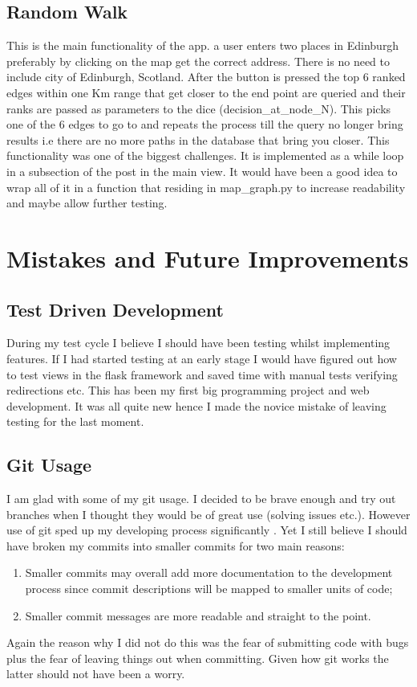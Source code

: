 \documentclass[11pt]{article}
\begin{document}
\subsection{Random Walk}
This is the main functionality of the app. a user enters two places in Edinburgh preferably by clicking on the map get the correct address. There is no need to include city of Edinburgh, Scotland.
\newline
\newline
After the button is pressed the top 6 ranked edges within one Km range that get closer to the end point are queried and their ranks are passed
as parameters to the dice (decision\_at\_node\_N). This picks one of the 6 edges to go to and repeats the process till the query no longer bring results i.e there are no more paths in the database that bring you closer. 
\newline
\newline
This functionality was one of the biggest challenges. It is implemented as a while loop in a subsection of the post in the main view. It would have been a good idea to wrap all of it in a function that residing in map\_graph.py to increase readability and maybe allow further testing.
\section{Mistakes and Future Improvements}
\subsection{Test Driven Development}
During my test cycle I believe I should have been testing whilst implementing features. If I had started testing at an early stage I would have figured out how to test views in the flask framework and saved time with manual tests verifying redirections etc.
\newline
This has been my first big programming project and web development. It was all quite new hence I made the novice mistake of leaving testing for the last moment.
\subsection{Git Usage}
I am glad with some of my git usage. I decided to be brave enough and try out branches when I thought they would be of great use (solving issues etc.). However use of git sped up my developing process significantly . Yet I still believe I should have broken my commits into smaller commits for two main reasons:
\begin{enumerate}
\item Smaller commits may overall add more documentation to the development process since commit descriptions will be mapped to smaller units of code;
\item Smaller commit messages are more readable and straight to the point.
\end{enumerate}
Again the reason why I did not do this was the fear of submitting code with bugs plus the fear of leaving things out when committing. Given how git works the latter should not have been a worry.
\end{document}
